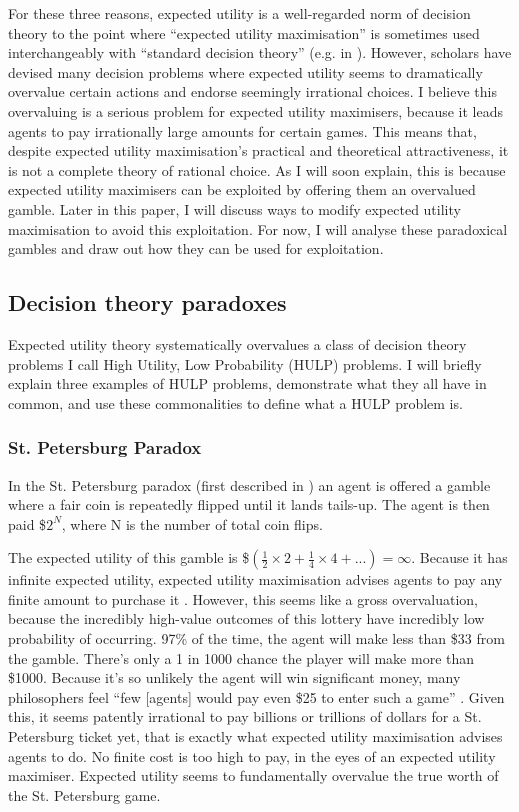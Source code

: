 \documentclass{article}
\begin{document}
For these three reasons, expected utility is a well-regarded norm of decision theory \textemdash{} to the point where ``expected utility maximisation'' is sometimes used interchangeably with ``standard decision theory'' (e.g. in \citet[pg. 38]{colyvan2008relative}). However, scholars have devised many decision problems where expected utility seems to dramatically overvalue certain actions and endorse seemingly irrational choices. I believe this overvaluing is a serious problem for expected utility maximisers, because it leads agents to pay irrationally large amounts for certain games. This means that, despite expected utility maximisation's practical and theoretical attractiveness, it is not a complete theory of rational choice. As I will soon explain, this is because expected utility maximisers can be exploited by offering them an overvalued gamble. Later in this paper, I will discuss ways to modify expected utility maximisation to avoid this exploitation. For now, I will analyse these paradoxical gambles and draw out how they can be used for exploitation.

\subsection {Decision theory paradoxes}

Expected utility theory systematically overvalues a class of decision theory problems I call High Utility, Low Probability (HULP) problems. I will briefly explain three examples of HULP problems, demonstrate what they all have in common, and use these commonalities to define what a HULP problem is.

\subsubsection {St. Petersburg Paradox}

In the St. Petersburg paradox (first described in \citet{bernoulli1954exposition}) an agent is offered a gamble where a fair coin is repeatedly flipped until it lands tails-up. The agent is then paid \$\(2^N\), where N is the number of total coin flips.

The expected utility of this gamble is \$\((\frac{1}{2}\times2 + \frac{1}{4}\times4+...) = \infty\). Because it has infinite expected utility, expected utility maximisation advises agents to pay any finite amount to purchase it \citep{resnik1987choices}. However, this seems like a gross overvaluation, because the incredibly high-value outcomes of this lottery have incredibly low probability of occurring. 97\% of the time, the agent will make less than \$33 from the gamble. There's only a 1 in 1000 chance the player will make more than \$1000. Because it's so unlikely the agent will win significant money, many philosophers feel ``few [agents] would pay even \$25 to enter such a game'' \citep{hacking1980strange}. Given this, it seems patently irrational to pay billions or trillions of dollars for a St. Petersburg ticket \textemdash{} yet, that is exactly what expected utility maximisation advises agents to do. No finite cost is too high to pay, in the eyes of an expected utility maximiser. Expected utility seems to fundamentally overvalue the true worth of the St. Petersburg game.
\end{document}
